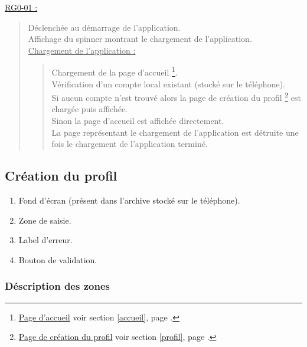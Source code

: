 \documentclass{report}
\begin{document}
		\underline{RG0-01 :}
		\begin{quote}
			Déclenchée au démarrage de l'application.\\
			Affichage du spinner montrant le chargement de l'application.\\
			\underline{Chargement de l'application :}
				\begin{quote}
					Chargement de la page d'accueil%
					\footnote[1]{
						\hyperlink{Page d'accueil}{Page d'accueil}
						\og voir section \ref{accueil}, page \pageref{accueil}.\fg
					}.\\
					Vérification d'un compte local existant (stocké sur le téléphone).\\
					Si aucun compte n'est trouvé alors la page de création du profil%
					\footnote[2]{
						\hyperlink{Création du profil}{Page de création du profil}
						\og voir section \ref{profil}, page \pageref{profil}.\fg
					}
					est chargée puis affichée.\\
					Sinon la page d'accueil%
					\footnotemark[1]
					est affichée directement. \\
					La page représentant le chargement de l'application est détruite une fois le chargement de l'application terminé.\\
				\end{quote}
		\end{quote}

	
\newpage

	\subsection{Création du profil}
		\hypertarget{Création du profil}{}
		\label{profil}

		\begin{center}
			
		\end{center}

		\begin{enumerate}
		  \item Fond d'écran (présent dans l'archive stocké sur le téléphone).
		  \item Zone de saisie.
		  \item Label d'erreur.
		  \item Bouton de validation.
		\end{enumerate}

		\subsubsection{Déscription des zones}
				
\end{document}
